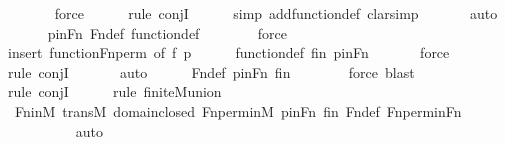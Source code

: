 \begin{isabellebody}
\ \ \ \ \ \isamarkupfalse%
\ force\ \isanewline
\ \ \ \ \isamarkupfalse%
{\isacharparenleft}{\kern0pt}rule\ conjI{\isacharparenright}{\kern0pt}\isanewline
\ \ \ \ \ \isamarkupfalse%
{\isacharparenleft}{\kern0pt}simp\ add{\isacharcolon}{\kern0pt}function{\isacharunderscore}{\kern0pt}def{\isacharcomma}{\kern0pt}\ clarsimp{\isacharparenright}{\kern0pt}\isanewline
\ \ \ \ \ \isamarkupfalse%
\ auto{\isacharbrackleft}{\kern0pt}{}{\isacharbrackright}{\kern0pt}\isanewline
\ \ \ \ \isamarkupfalse%
\ pinFn\ Fn{\isacharunderscore}{\kern0pt}def\ function{\isacharunderscore}{\kern0pt}def\isanewline
\ \ \ \ \ \ \isamarkupfalse%
\ force\isanewline
\ \ \ \ \ \isamarkupfalse%
{\isacharparenleft}{\kern0pt}insert\ function{\isacharunderscore}{\kern0pt}Fn{\isacharunderscore}{\kern0pt}perm\ {\isacharbrackleft}{\kern0pt}of\ f\ p{\isacharbrackright}{\kern0pt}{\isacharparenright}{\kern0pt}\isanewline
\ \ \ \ \isamarkupfalse%
\ function{\isacharunderscore}{\kern0pt}def\ fin\ pinFn\isanewline
\ \ \ \ \ \isamarkupfalse%
\ force\ \isanewline
\ \ \ \ \isamarkupfalse%
{\isacharparenleft}{\kern0pt}rule\ conjI{\isacharparenright}{\kern0pt}\isanewline
\ \ \ \ \ \isamarkupfalse%
\ auto{\isacharbrackleft}{\kern0pt}{}{\isacharbrackright}{\kern0pt}\isanewline
\ \ \ \ \isamarkupfalse%
\ Fn{\isacharunderscore}{\kern0pt}def\ pinFn\ fin\isanewline
\ \ \ \ \ \ \isamarkupfalse%
\ {\isacharparenleft}{\kern0pt}force{\isacharcomma}{\kern0pt}\ blast{\isacharparenright}{\kern0pt}\isanewline
\ \ \ \ \isamarkupfalse%
{\isacharparenleft}{\kern0pt}rule\ conjI{\isacharparenright}{\kern0pt}\isanewline
\ \ \ \ \ \isamarkupfalse%
{\isacharparenleft}{\kern0pt}rule\ finite{\isacharunderscore}{\kern0pt}M{\isacharunderscore}{\kern0pt}union{\isacharparenright}{\kern0pt}\isanewline
\ \ \ \ \isamarkupfalse%
\ Fn{\isacharunderscore}{\kern0pt}in{\isacharunderscore}{\kern0pt}M\ transM\ domain{\isacharunderscore}{\kern0pt}closed\ Fn{\isacharunderscore}{\kern0pt}perm{\isacharunderscore}{\kern0pt}in{\isacharunderscore}{\kern0pt}M\ pinFn\ fin\ Fn{\isacharunderscore}{\kern0pt}def\ Fn{\isacharunderscore}{\kern0pt}perm{\isacharunderscore}{\kern0pt}in{\isacharunderscore}{\kern0pt}Fn\isanewline
\ \ \ \ \ \ \ \ \isamarkupfalse%
\ auto{\isacharbrackleft}{\kern0pt}{}{\isacharbrackright}{\kern0pt}\isanewline

\end{isabellebody}
